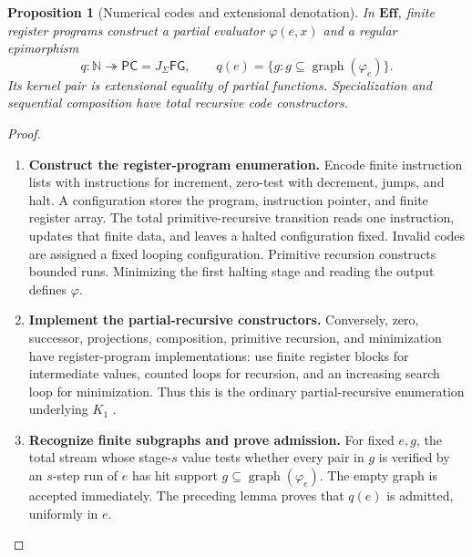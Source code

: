 \documentclass[11pt,a4paper]{article}
\numberwithin{algorithm}{section}
\numberwithin{equation}{section}
\newtheorem{proposition}[proposition]{Proposition}
\theoremstyle{definition}
\theoremstyle{remark}
\theoremstyle{plain}
\newcommand{\N}{\mathbb N}
\newcommand{\J}{J_{\Sigma}}
\newcommand{\Eff}{\mathbf{Eff}}
\newcommand{\onto}{\twoheadrightarrow}
\theoremstyle{definition}
\theoremstyle{plain}
\begin{document}
\begin{proposition}[Numerical codes and extensional denotation]
\label{prop:standalone-numerical-cover}
In $\Eff$, finite register programs construct a partial evaluator
$\varphi(e,x)$ and a regular epimorphism
\[
 q:\N\onto\mathsf{PC}=\J\mathsf{FG},\qquad
 q(e)=\{g:g\subseteq\operatorname{graph}(\varphi_e)\}.
\]
Its kernel pair is extensional equality of partial functions.
Specialization and sequential composition have total recursive
code constructors.
\end{proposition}
\begin{proof}\leavevmode
\begin{enumerate}[leftmargin=*,align=left]
\item \textbf{Construct the register-program enumeration.}
Encode finite instruction lists with instructions for increment,
zero-test with decrement, jumps, and halt. A configuration stores
the program, instruction pointer, and finite register array.
The total primitive-recursive transition reads one instruction,
updates that finite data, and leaves a halted configuration fixed.
Invalid codes are assigned a fixed looping configuration.
Primitive recursion constructs bounded runs. Minimizing the
first halting stage and reading the output defines $\varphi$.

\item \textbf{Implement the partial-recursive constructors.}
Conversely, zero, successor, projections, composition, primitive
recursion, and minimization have register-program implementations:
use finite register blocks for intermediate values, counted loops
for recursion, and an increasing search loop for minimization.
Thus this is the ordinary partial-recursive enumeration underlying
$K_1$ \citep{VanOosten2008Realizability}.

\item \textbf{Recognize finite subgraphs and prove admission.}
For fixed $e,g$, the total stream whose stage-$s$ value tests
whether every pair in $g$ is verified by an $s$-step run of $e$
has hit support $g\subseteq\operatorname{graph}(\varphi_e)$.
The empty graph is accepted immediately.
The preceding lemma proves that $q(e)$ is admitted, uniformly in $e$.


\end{enumerate}
\end{proof}
\end{document}
